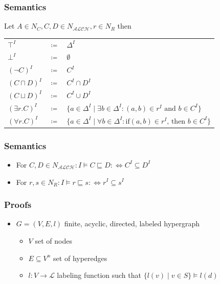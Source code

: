 \documentclass{beamer}
\begin{document}
\begin{frame}
\frametitle{Semantics}
Let $A \in N_C, C, D \in N_{\mathcal{ALCH}}, r \in N_R$ then
  \begin{center}
    \begin{tabular}{l c l}
    
      $\top^I$& $\coloneqq$& $\Delta^I$ \\
      $\bot^I$& $\coloneqq$& $\emptyset$\\      
      $(\neg C)^I$ & $\coloneqq$ & $C^I$ \\
      $(C \sqcap D)^I$ & $\coloneqq$ & $C^I \cap D^I$ \\
      $(C \sqcup D)^I$ & $\coloneqq$ & $C^I \cup D^I$ \\
      $(\exists r.C)^I$ & $\coloneqq$ & $ \{a \in \Delta^I \mid \exists b \in \Delta^I : (a,b) \in r^I \text{ and } b \in C^I \}$ \\
      $(\forall r.C)^I$ & $\coloneqq$ & $ \{a \in \Delta^I \mid \forall b \in \Delta^I : \text{if} (a,b) \in r^I \text{, then } b \in C^I \}$ \\
      \end{tabular}        
  \end{center}
\end{frame}

\begin{frame}
    \frametitle{Semantics}
    \begin{itemize}
        \item For $C, D \in N_{\mathcal{ALCH}}: I \models C \sqsubseteq D  :\iff C^I \subseteq D^I$ \\
        \item For $r, s \in N_R: I \models r \sqsubseteq s  :\iff r^I \subseteq s^I$
    \end{itemize}
    
   
\end{frame}

\begin{frame}
\frametitle{Proofs}
\begin{itemize}
    \item $G = (V, E, l)$ finite, acyclic, directed, labeled hypergraph
    \begin{itemize}
        \item $V$ set of nodes
        \item $E \subseteq V^n$ set of hyperedges 
        \item $l: V \rightarrow \mathcal{L}$ labeling function such that $\{l(v) \mid v \in S \} \models l(d)$
    \end{itemize}
\end{itemize}
\end{frame}
\end{document}
